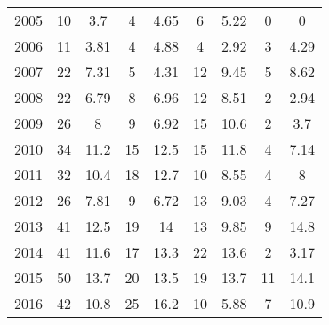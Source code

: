 \begin{table}[htbp]
\begin{tabular}{l*{8}{c}}
2005      &       10&      3.7&        4&     4.65&        6&     5.22&        0&        0\\
2006      &       11&     3.81&        4&     4.88&        4&     2.92&        3&     4.29\\
2007      &       22&     7.31&        5&     4.31&       12&     9.45&        5&     8.62\\
2008      &       22&     6.79&        8&     6.96&       12&     8.51&        2&     2.94\\
2009      &       26&        8&        9&     6.92&       15&     10.6&        2&      3.7\\
2010      &       34&     11.2&       15&     12.5&       15&     11.8&        4&     7.14\\
2011      &       32&     10.4&       18&     12.7&       10&     8.55&        4&        8\\
2012      &       26&     7.81&        9&     6.72&       13&     9.03&        4&     7.27\\
2013      &       41&     12.5&       19&       14&       13&     9.85&        9&     14.8\\
2014      &       41&     11.6&       17&     13.3&       22&     13.6&        2&     3.17\\
2015      &       50&     13.7&       20&     13.5&       19&     13.7&       11&     14.1\\
2016      &       42&     10.8&       25&     16.2&       10&     5.88&        7&     10.9\\
\hline\hline
\end{tabular}
\end{table}

